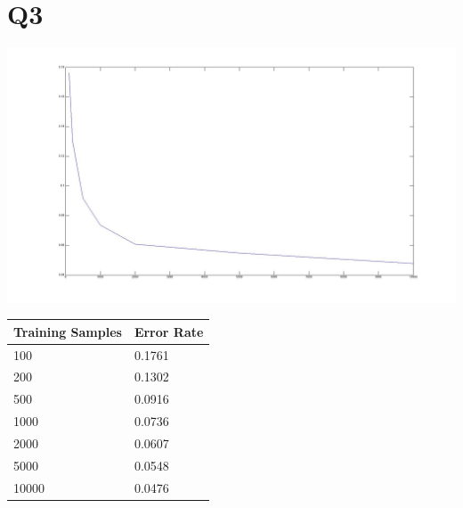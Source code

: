 \documentclass[12pt]{article}
\begin{document}
\newpage
\section*{Q3}
  \includegraphics[scale=0.3]{q3_normalized_tap.jpg}
  \begin{tabular}{l|l}
    \hline
    Training Samples & Error Rate \\
    \hline
    100   & 0.1761 \\
    200   & 0.1302 \\
    500   & 0.0916 \\
    1000  & 0.0736 \\
    2000  & 0.0607 \\
    5000  & 0.0548 \\
    10000 & 0.0476 \\
  \end{tabular}
\end{document}
